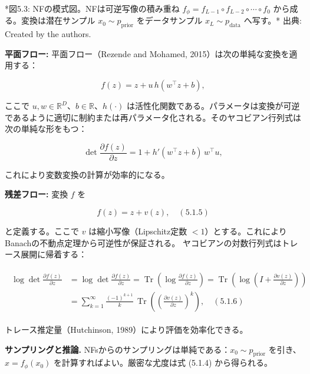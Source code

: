 

*図5.3: NFの模式図。NFは可逆写像の積み重ね $f_\phi = f_{L-1}\circ f_{L-2}\circ\cdots\circ f_0$ から成る。変換は潜在サンプル $x_0\sim p_{\mathrm{prior}}$ をデータサンプル $x_L\sim p_{\mathrm{data}}$ へ写す。*
出典: Created by the authors.

\textbf{平面フロー:} 平面フロー（Rezende and Mohamed, 2015）は次の単純な変換を適用する：

\[
f(z) = z + u\, h(w^\top z + b),
\]


ここで $u, w \in \mathbb{R}^D$、$b \in \mathbb{R}$、$h(\cdot)$ は活性化関数である。パラメータは変換が可逆であるように適切に制約または再パラメータ化される。そのヤコビアン行列式は次の単純な形をもつ：

\[
\det \frac{\partial f(z)}{\partial z} = 1 + h'(w^\top z + b)\, w^\top u,
\]


これにより変数変換の計算が効率的になる。

\textbf{残差フロー:} 変換 $f$ を

\[
f(z) = z + v(z), \quad (5.1.5)
\]


と定義する。ここで $v$ は縮小写像（Lipschitz定数 $< 1$）とする。これにより Banachの不動点定理から可逆性が保証される。
ヤコビアンの対数行列式はトレース展開に帰着する：

\begin{align*}
\begin{aligned}
\log\det\frac{\partial f(z)}{\partial z}
&= \log\det\frac{\partial f(z)}{\partial z}
= \operatorname{Tr}\!\left(\log\frac{\partial f(z)}{\partial z}\right)
= \operatorname{Tr}\!\left(\log\!\left(I + \frac{\partial v(z)}{\partial z}\right)\right) \\
&= \sum_{k=1}^{\infty} \frac{(-1)^{k+1}}{k}\, \operatorname{Tr}\!\left(\left(\frac{\partial v(z)}{\partial z}\right)^k\right), \quad (5.1.6)
\end{aligned}
\end{align*}


トレース推定量（Hutchinson, 1989）により評価を効率化できる。

\textbf{サンプリングと推論.} NFsからのサンプリングは単純である：$x_0 \sim p_{\mathrm{prior}}$ を引き、$x = f_\phi(x_0)$ を計算すればよい。厳密な尤度は式 (5.1.4) から得られる。



